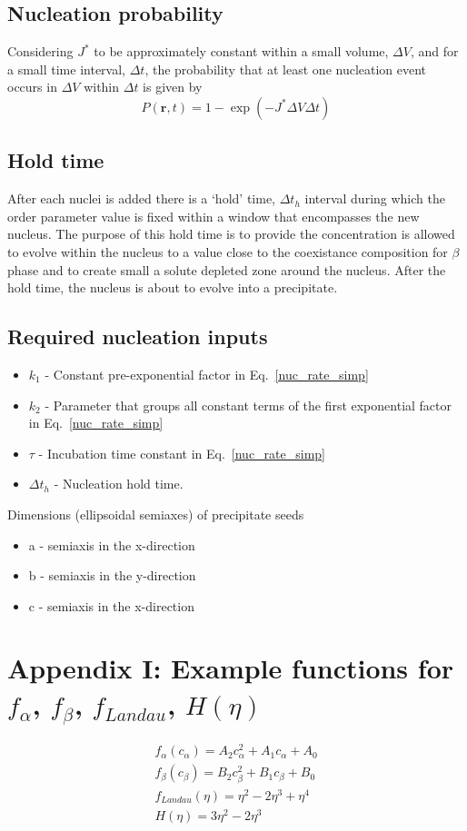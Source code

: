 \documentclass[11pt]{article}
\renewcommand{\=}[1]{\stackrel{#1}{=}} %
\theoremstyle{definition}
\theoremstyle{remark}
\begin{document}
\subsection{Nucleation probability}

Considering  $J^*$ to be approximately constant within a small volume, $\Delta V$, and for a small time interval, $\Delta t$, the probability that at least one nucleation event occurs in $\Delta V$ within $\Delta t$ is given by
\\
\begin{equation}
\label{nuc_prob}
P(\mathbf{r},t) = 1 - \exp \left( -J^* \Delta V \Delta t \right)
\end{equation}
\subsection{Hold time}

After each nuclei is added there is a `hold' time, $\Delta t_h$ interval during which the order parameter value is fixed within a window that encompasses the new nucleus. The purpose of this hold time is to provide the concentration is allowed to evolve within the nucleus to a value close to the coexistance composition for $\beta$ phase and to create small a solute depleted zone around the nucleus. After the hold time, the nucleus is about to evolve into a precipitate.

\subsection{Required nucleation inputs}
\begin{itemize}
\item $k_1$ - Constant pre-exponential factor in Eq.~\eqref{nuc_rate_simp}
\item $k_2$ - Parameter that groups all constant terms of the first exponential factor in Eq.~\eqref{nuc_rate_simp} 
\item $\tau$ - Incubation time constant in Eq.~\eqref{nuc_rate_simp}
\item $\Delta t_h$ - Nucleation hold time.
\end{itemize}
Dimensions (ellipsoidal semiaxes) of precipitate seeds
\begin{itemize}
\item a - semiaxis in the x-direction
\item b - semiaxis in the y-direction
\item c - semiaxis in the x-direction
\end{itemize}

\section*{Appendix I: Example functions for $f_{\alpha}$, $f_{\beta}$, $f_{Landau}$, $H(\eta)$ }
\begin{gather}
f_{\alpha}(c_{\alpha}) = A_{2} c_{\alpha}^2 + A_{1} c_{\alpha} + A_{0} \\
f_{\beta}(c_{\beta}) = B_{2} c_{\beta}^2 + B_{1} c_{\beta} + B_{0} \\
f_{Landau}(\eta) = \eta^2  - 2\eta^3 +  \eta^4\\
H(\eta) = 3 \eta^2 - 2 \eta^3
\end{gather}
\end{document}
